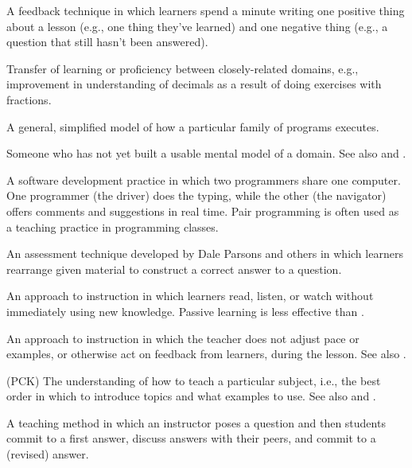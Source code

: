 \begin{description}
 A feedback technique in which learners
spend a minute writing one positive thing about a lesson (e.g., one thing
they've learned) and one negative thing (e.g., a question that still hasn't been
answered).

 Transfer of learning or proficiency
between closely-related domains, e.g., improvement in understanding of decimals
as a result of doing exercises with fractions.

 A general, simplified model of how
a particular family of programs executes.

 Someone who has not yet built a usable mental model of
a domain. See also 
and .

 A software development practice in
which two programmers share one computer. One programmer (the driver) does the
typing, while the other (the navigator) offers comments and suggestions in real
time. Pair programming is often used as a teaching practice in programming
classes.

 An assessment technique developed by
Dale Parsons and others in which learners rearrange given material to construct
a correct answer to a question.

 An approach to instruction in which
learners read, listen, or watch without immediately using new knowledge.
Passive learning is less effective than .

 An approach to instruction in which
the teacher does not adjust pace or examples, or otherwise act on feedback from
learners, during the lesson.  See also .

 (PCK)
The understanding of how to teach a particular subject, i.e., the best order in
which to introduce topics and what examples to use. See also
and .

 A teaching method in which an
instructor poses a question and then students commit to a first answer, discuss
answers with their peers, and commit to a (revised) answer.


\end{description}

